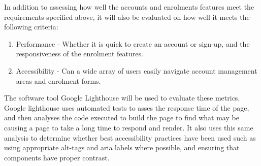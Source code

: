 In addition to assessing how well the accounts and enrolments features meet the requirements specified above, it will also be evaluated on how well it meets the following criteria:
\begin{enumerate}
    \item Performance - Whether it is quick to create an account or sign-up, and the responsiveness of the enrolment features.
    \item Accessibility - Can a wide array of users easily navigate account management areas and enrolment forms.
\end{enumerate}
The software tool Google Lighthouse will be used to evaluate these metrics. Google lighthouse uses automated tests to asses the response time of the page, and then analyses the code executed to build the page to find what may be causing a page to take a long time to respond and render. It also uses this same analysis to determine whether best accessibility practices have been used such as using appropriate alt-tags and aria labels where possible, and ensuring that components have proper contrast.